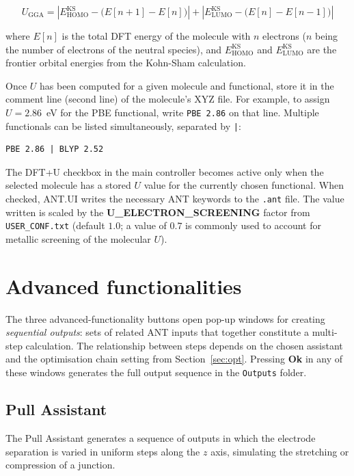 \documentclass[12pt]{article}
\begin{document}
\begin{equation}
    U_{\mathrm{GGA}} = \left|E_{\mathrm{HOMO}}^{\mathrm{KS}} - \bigl(E[n+1] - E[n]\bigr)\right| + \left|E_{\mathrm{LUMO}}^{\mathrm{KS}} - \bigl(E[n] - E[n-1]\bigr)\right|
\end{equation}

where $E[n]$ is the total DFT energy of the molecule with $n$ electrons ($n$ being the number of electrons of the neutral species), and $E_{\mathrm{HOMO}}^{\mathrm{KS}}$ and $E_{\mathrm{LUMO}}^{\mathrm{KS}}$ are the frontier orbital energies from the Kohn-Sham calculation.

Once $U$ has been computed for a given molecule and functional, store it in the comment line (second line) of the molecule's XYZ file. For example, to assign $U = 2.86$~eV for the PBE functional, write \texttt{PBE 2.86} on that line. Multiple functionals can be listed simultaneously, separated by \texttt{|}:

\begin{verbatim}
PBE 2.86 | BLYP 2.52
\end{verbatim}

The DFT+U checkbox in the main controller becomes active only when the selected molecule has a stored $U$ value for the currently chosen functional. When checked, ANT.UI writes the necessary ANT keywords to the \texttt{.ant} file. The value written is scaled by the \textbf{U\_ELECTRON\_SCREENING} factor from \texttt{USER\_CONF.txt} (default $1.0$; a value of $0.7$ is commonly used to account for metallic screening of the molecular $U$).

\newpage
\section{Advanced functionalities}\label{sec:adv}

The three advanced-functionality buttons open pop-up windows for creating \emph{sequential outputs}: sets of related ANT inputs that together constitute a multi-step calculation. The relationship between steps depends on the chosen assistant and the optimisation chain setting from Section~\ref{sec:opt}. Pressing \textbf{Ok} in any of these windows generates the full output sequence in the \texttt{Outputs} folder.

    \subsection{Pull Assistant}

    The Pull Assistant generates a sequence of outputs in which the electrode separation is varied in uniform steps along the $z$ axis, simulating the stretching or compression of a junction.
\end{document}
